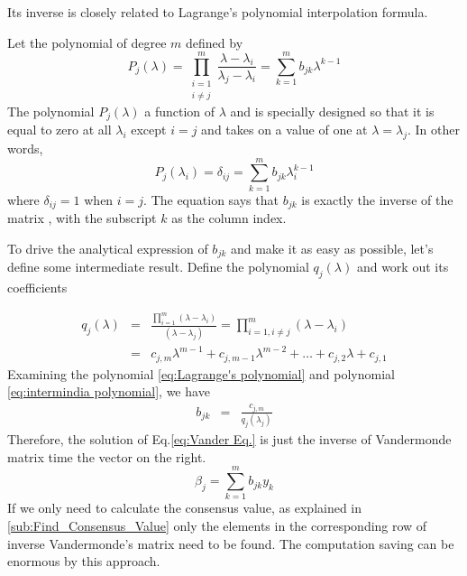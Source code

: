 Its inverse is closely related to Lagrange's polynomial interpolation
formula. 

Let the polynomial of degree $m$ defined by 
\begin{equation}
P_{j}\left(\lambda\right)=\prod_{\begin{array}{c}
i=1\\
i\neq j
\end{array}}^{m}\frac{\lambda-\lambda_{i}}{\lambda_{j}-\lambda_{i}}=\sum_{k=1}^{m}b_{jk}\lambda^{k-1}\label{eq:Lagrange's polynomial}
\end{equation}
The polynomial $P_{j}\left(\lambda\right)$ a function of $\lambda$
and is specially designed so that it is equal to zero at all $\lambda_{i}$
except $i=j$ and takes on a value of one at $\lambda=\lambda_{j}$.
In other words, 
\[
P_{j}\left(\lambda_{i}\right)=\delta_{ij}=\sum_{k=1}^{m}b_{jk}\lambda_{i}^{k-1}
\]
where $\delta_{ij}=1$ when $i=j$. The equation says that $b_{jk}$
is exactly the inverse of the matrix ,
with the subscript $k$ as the column index. 

To drive the analytical expression of $b_{jk}$ and make it as easy
as possible, let's define some intermediate result. Define the polynomial
$q_{j}\left(\lambda\right)$ and work out its coefficients

\begin{eqnarray}
q_{j}\left(\lambda\right) & = & \frac{\prod_{i=1}^{m}\left(\lambda-\lambda_{i}\right)}{\left(\lambda-\lambda_{j}\right)}=\prod_{i=1,i\neq j}^{m}\left(\lambda-\lambda_{i}\right)\label{eq:intermindia polynomial}\\
 & = & c_{j,m}\lambda^{m-1}+c_{j,m-1}\lambda^{m-2}+\ldots+c_{j,2}\lambda+c_{j,1}\nonumber 
\end{eqnarray}
Examining the polynomial \ref{eq:Lagrange's polynomial} and polynomial
\ref{eq:intermindia polynomial}, we have 
\begin{eqnarray*}
b_{jk} & = & \frac{c_{j,m}}{q_{j}\left(\lambda_{j}\right)}
\end{eqnarray*}
Therefore, the solution of Eq.\ref{eq:Vander Eq.} is just the inverse
of Vandermonde matrix time the vector on the right. 
\[
\beta_{j}=\sum_{k=1}^{m}b_{jk}y_{k}
\]
If we only need to calculate the consensus value, as explained in
\ref{sub:Find_Consensus_Value} only the elements in the corresponding
row of inverse Vandermonde's matrix need to be found. The computation
saving can be enormous by this approach.
